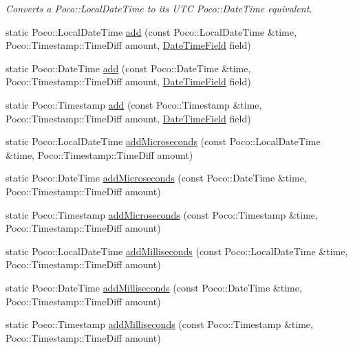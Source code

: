 \begin{DoxyCompactItemize}
\begin{DoxyCompactList}\small\item\em Converts a Poco\-::\-Local\-Date\-Time to its U\-T\-C Poco\-::\-Date\-Time equivalent. \end{DoxyCompactList}\item 
static Poco\-::\-Local\-Date\-Time \hyperlink{classofx_1_1_time_1_1_utils_a49643912f45b75cba987558da3b8a11b}{add} (const Poco\-::\-Local\-Date\-Time \&time, Poco\-::\-Timestamp\-::\-Time\-Diff amount, \hyperlink{classofx_1_1_time_1_1_utils_aaab0e5bd305761231f063a0701785112}{Date\-Time\-Field} field)
\item 
static Poco\-::\-Date\-Time \hyperlink{classofx_1_1_time_1_1_utils_abfffcae455ab383642fd887460cc4a4e}{add} (const Poco\-::\-Date\-Time \&time, Poco\-::\-Timestamp\-::\-Time\-Diff amount, \hyperlink{classofx_1_1_time_1_1_utils_aaab0e5bd305761231f063a0701785112}{Date\-Time\-Field} field)
\item 
static Poco\-::\-Timestamp \hyperlink{classofx_1_1_time_1_1_utils_a827ea2e2a78e2809a4b4266825125ea5}{add} (const Poco\-::\-Timestamp \&time, Poco\-::\-Timestamp\-::\-Time\-Diff amount, \hyperlink{classofx_1_1_time_1_1_utils_aaab0e5bd305761231f063a0701785112}{Date\-Time\-Field} field)
\item 
static Poco\-::\-Local\-Date\-Time \hyperlink{classofx_1_1_time_1_1_utils_a99e52f0d722ba14d6ebb5553cb2439b7}{add\-Microseconds} (const Poco\-::\-Local\-Date\-Time \&time, Poco\-::\-Timestamp\-::\-Time\-Diff amount)
\item 
static Poco\-::\-Date\-Time \hyperlink{classofx_1_1_time_1_1_utils_a61ea72a0a84a7c96587163b9e99d6907}{add\-Microseconds} (const Poco\-::\-Date\-Time \&time, Poco\-::\-Timestamp\-::\-Time\-Diff amount)
\item 
static Poco\-::\-Timestamp \hyperlink{classofx_1_1_time_1_1_utils_a47a051310480cc97f0ce8f8f1f91905b}{add\-Microseconds} (const Poco\-::\-Timestamp \&time, Poco\-::\-Timestamp\-::\-Time\-Diff amount)
\item 
static Poco\-::\-Local\-Date\-Time \hyperlink{classofx_1_1_time_1_1_utils_ab04b1cb52c1ba6883be94aee0279670b}{add\-Milliseconds} (const Poco\-::\-Local\-Date\-Time \&time, Poco\-::\-Timestamp\-::\-Time\-Diff amount)
\item 
static Poco\-::\-Date\-Time \hyperlink{classofx_1_1_time_1_1_utils_a8c12f8f2dd330272b545ff71be2bb59d}{add\-Milliseconds} (const Poco\-::\-Date\-Time \&time, Poco\-::\-Timestamp\-::\-Time\-Diff amount)
\item 
static Poco\-::\-Timestamp \hyperlink{classofx_1_1_time_1_1_utils_aadbe39e1fccd2918dc0cd3e7c16c54bb}{add\-Milliseconds} (const Poco\-::\-Timestamp \&time, Poco\-::\-Timestamp\-::\-Time\-Diff amount)

\end{DoxyCompactItemize}
